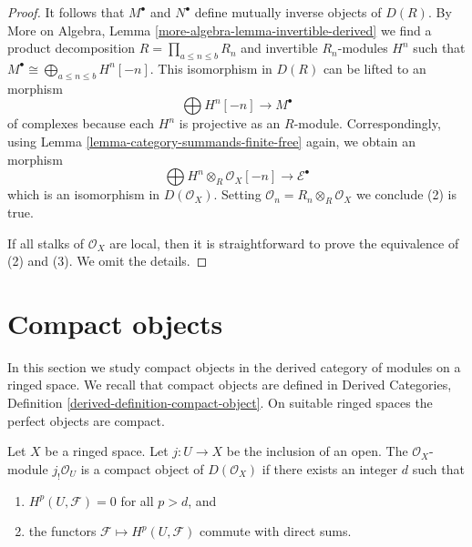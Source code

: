\begin{proof}
It follows that $M^\bullet$ and $N^\bullet$ define
mutually inverse objects of $D(R)$. By
More on Algebra, Lemma \ref{more-algebra-lemma-invertible-derived}
we find a product decomposition $R = \prod_{a \leq n \leq b} R_n$
and invertible $R_n$-modules $H^n$ such
that $M^\bullet \cong \bigoplus_{a \leq n \leq b} H^n[-n]$.
This isomorphism in $D(R)$ can be lifted to an morphism
$$
\bigoplus H^n[-n] \longrightarrow M^\bullet
$$
of complexes because each $H^n$ is projective as an $R$-module.
Correspondingly, using Lemma \ref{lemma-category-summands-finite-free} again,
we obtain an morphism
$$
\bigoplus H^n \otimes_R \mathcal{O}_X[-n] \to \mathcal{E}^\bullet
$$
which is an isomorphism in $D(\mathcal{O}_X)$. Setting
$\mathcal{O}_n = R_n \otimes_R \mathcal{O}_X$ we conclude (2) is true.

\medskip\noindent
If all stalks of $\mathcal{O}_X$ are local, then it is straightforward
to prove the equivalence of (2) and (3). We omit the details.
\end{proof}






\section{Compact objects}
\label{section-compact}

\noindent
In this section we study compact objects in the derived category of modules
on a ringed space. We recall that compact objects are defined in
Derived Categories, Definition \ref{derived-definition-compact-object}.
On suitable ringed spaces the perfect objects are compact.

\begin{lemma}
\label{lemma-when-jshriek-compact}
Let $X$ be a ringed space. Let $j : U \to X$ be the
inclusion of an open. The $\mathcal{O}_X$-module $j_!\mathcal{O}_U$ is a
compact object of $D(\mathcal{O}_X)$ if there exists an integer $d$ such that
\begin{enumerate}
\item $H^p(U, \mathcal{F}) = 0$ for all $p > d$, and
\item the functors $\mathcal{F} \mapsto H^p(U, \mathcal{F})$
commute with direct sums.
\end{enumerate}
\end{lemma}

